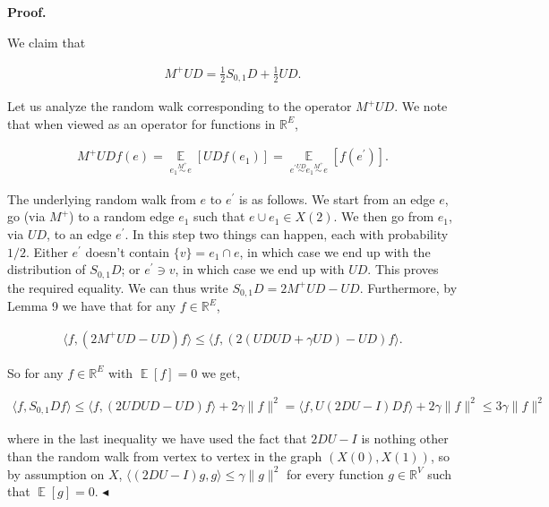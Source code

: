 \documentclass[10pt,a4paper]{article}
\begin{document}
\par\medskip\noindent\textbf{Proof.}\par




We claim that\par


\[\begin{gathered}
M^{+}UD=\frac{1}{2}S_{0,1}D+\frac{1}{2}UD.
\end{gathered}\]


Let us analyze the random walk corresponding to the operator $M^{+}UD$. We note that when viewed as an operator for functions in $\mathbb{R}^{E}$,\par


\[\begin{gathered}
M^{+}UDf(e)=\operatorname*{\mathbb{E}}_{e_{1}\stackrel{{\scriptstyle M^{+}}}{{\sim}}e}[UDf(e_{1})]=\operatorname*{\mathbb{E}}_{e^{\prime}\stackrel{{\scriptstyle UD}}{{\sim}}e_{1}\stackrel{{\scriptstyle M^{+}}}{{\sim}}e}[f(e^{\prime})].
\end{gathered}\]


The underlying random walk from $e$ to $e^{\prime}$ is as follows.
We start from an edge $e$, go (via $M^{+}$) to a random edge $e_{1}$ such that $e\cup e_{1}\in X(2)$. We then
go from $e_{1}$, via $UD$, to an edge $e^{\prime}$. In this step two things can happen, each with probability $1/2$. Either $e^{\prime}$ doesn’t contain $\{v\}=e_{1}\cap e$, in which case we end up with the distribution of $S_{0,1}D$; or $e^{\prime}\ni v$, in which case we end up with $UD$. This proves the required equality.
We can thus write $S_{0,1}D=2M^{+}UD-UD$. Furthermore, by Lemma 9 we have that for any $f\in\mathbb{R}^{E}$,\par


\[\begin{gathered}
\langle f,(2M^{+}UD-UD)f\rangle\leq\langle f,(2(UDUD+\gamma UD)-UD)f\rangle.
\end{gathered}\]


So for any $f\in\mathbb{R}^{E}$ with $\operatorname*{\mathbb{E}}[f]=0$ we get,\par


\[\begin{gathered}
\langle f,S_{0,1}Df\rangle\leq\langle f,(2UDUD-UD)f\rangle+2\gamma\lVert f\rVert^{2}=\langle f,U(2DU-I)Df\rangle+2\gamma\lVert f\rVert^{2}\leq 3\gamma\lVert f\rVert^{2}
\end{gathered}\]


where in the last inequality we have used the fact that $2DU-I$ is nothing other than the random walk from vertex to vertex in the graph $(X(0),X(1))$, so by assumption on $X$, $\langle(2DU-I)g,g\rangle\leq\gamma\lVert g\rVert^{2}$ for every function $g\in\mathbb{R}^{V}$ such that $\operatorname*{\mathbb{E}}[g]=0$.
$\blacktriangleleft$\par
\end{document}
